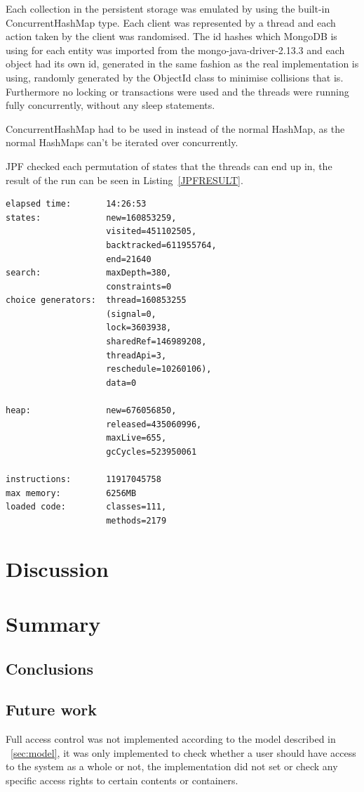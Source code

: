 \documentclass[a4paper,12pt]{article}
\begin{document}
Each collection in the persistent storage was emulated by using the built-in ConcurrentHashMap type.
Each client was represented by a thread and each action taken by the client was randomised. The id
hashes which MongoDB is using for each entity was imported from the mongo-java-driver-2.13.3 and
each object had its own id, generated in the same fashion as the real implementation is using,
randomly generated by the ObjectId class to minimise collisions that is.  Furthermore no locking or
transactions were used and the threads were running fully concurrently, without any sleep
statements. 

ConcurrentHashMap had to be used in instead of the normal HashMap, as the normal HashMaps can't be
iterated over concurrently.

JPF checked each permutation of states that the threads can end up in, the result of the run can be
seen in Listing~\ref{JPFRESULT}.

\begin{lstlisting}[label=JPFRESULT,caption=Results of JPF run]
elapsed time:       14:26:53
states:             new=160853259,
                    visited=451102505,
                    backtracked=611955764,
                    end=21640
search:             maxDepth=380,
                    constraints=0
choice generators:  thread=160853255 
                    (signal=0,
                    lock=3603938,
                    sharedRef=146989208,
                    threadApi=3,
                    reschedule=10260106), 
                    data=0

heap:               new=676056850,
                    released=435060996,
                    maxLive=655,
                    gcCycles=523950061

instructions:       11917045758
max memory:         6256MB
loaded code:        classes=111,
                    methods=2179
\end{lstlisting}


\section{Discussion}

\section{Summary}
\subsection{Conclusions}

\subsection{Future work}
Full access control was not implemented according to the model described in ~\ref{sec:model}, it
was only implemented to check whether a user should have access to the system as a whole or not, the
implementation did not set or check any specific access rights to certain contents or containers.



\newpage


\end{document}
